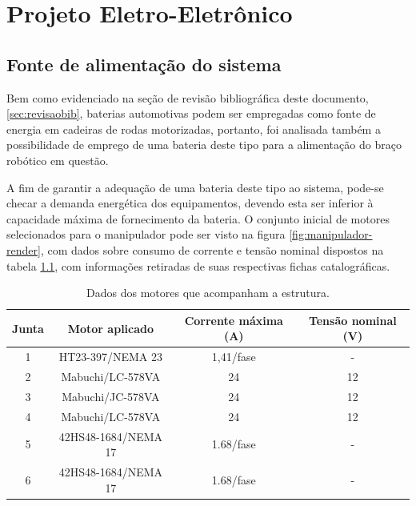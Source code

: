 \chapter{Projeto Eletro-Eletrônico}

\label{CapProjElet}




\section{Fonte de alimentação do sistema}
Bem como evidenciado na seção de revisão bibliográfica deste documento, \ref{sec:revisaobib}, 
baterias automotivas podem ser empregadas como fonte de energia em cadeiras de rodas 
motorizadas, portanto, foi analisada também a possibilidade de emprego de uma bateria
deste tipo para a alimentação do braço robótico em questão.

A fim de garantir a adequação de uma bateria deste tipo ao sistema, pode-se checar a demanda
energética dos equipamentos, devendo esta ser inferior à capacidade máxima de fornecimento
da bateria.
O conjunto inicial de motores selecionados para o manipulador pode ser visto na figura 
\ref{fig:manipulador-render}, com dados sobre consumo de corrente e tensão nominal dispostos na 
tabela \ref{tab:Motores}, com informações retiradas de suas respectivas fichas catalográficas.

\begin{table}[htb]
    \begin{centering}    
    
    \caption{Dados dos motores que acompanham a estrutura.}
    
    \begin{tabular}{|c|c|c|c|}
        \hline
        Junta & Motor aplicado & Corrente máxima (A) & Tensão nominal (V) \tabularnewline
        \hline
        \hline
        1 & HT23-397/NEMA 23 &  1,41/fase   & -  \tabularnewline
        \hline
        2 & Mabuchi/LC-578VA &       24     & 12 \tabularnewline
        \hline
        3 & Mabuchi/JC-578VA &       24     & 12 \tabularnewline
        \hline
        4 & Mabuchi/LC-578VA &       24     & 12 \tabularnewline
        \hline
        5 & 42HS48-1684/NEMA 17 & 1.68/fase & -  \tabularnewline
        \hline
        6 & 42HS48-1684/NEMA 17 & 1.68/fase & -  \tabularnewline
        \hline
    \end{tabular}

\label{tab:Motores}
    
\par\end{centering}
\end{table}

